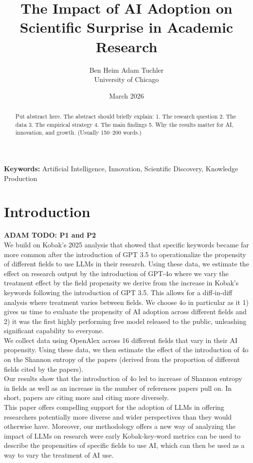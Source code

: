 \documentclass[11pt]{article}
\title{The Impact of AI Adoption on Scientific Surprise in Academic Research}
\author{
Ben Heim \hspace{1cm} Adam Tuchler \\
University of Chicago
}
\date{March 2026}
\begin{document}
\maketitle
\begin{abstract}
Put abstract here.
The abstract should briefly explain:
1. The research question
2. The data
3. The empirical strategy
4. The main findings
5. Why the results matter for AI, innovation, and growth.
(Usually 150–200 words.)
\end{abstract}
\noindent \textbf{Keywords:} Artificial Intelligence, Innovation, Scientific Discovery, Knowledge Production
\bigskip
\doublespacing
\section{Introduction}
\textbf{ADAM TODO: P1 and P2}\\
We build on Kobak's 2025 analysis that showed that specific keywords became far more common after the introduction of GPT 3.5 to operationalize the propensity of different fields to use LLMs in their research. Using these data, we estimate the effect on research output by the introduction of GPT-4o where we vary the treatment effect by the field propensity we derive from the increase in Kobak's keywords following the introduction of GPT 3.5. This allows for a diff-in-diff analysis where treatment varies between fields. We choose 4o in particular as it 1) gives us time to evaluate the propensity of AI adoption across different fields and 2) it was the first highly performing free model released to the public, unleashing significant capability to everyone.\\
We collect data using OpenAlex across 16 different fields that vary in their AI propensity. Using these data, we then estimate the effect of the introduction of 4o on the Shannon entropy of the papers (derived from the proportion of different fields cited by the papers).\\
Our results show that the introduction of 4o led to increase of Shannon entropy in fields as well as an increase in the number of references papers pull on. In short, papers are citing more and citing more diversely.\\
This paper offers compelling support for the adoption of LLMs in offering researchers potentially more diverse and wider perspectives than they would otherwise have. Moreover, our methodology offers a new way of analyzing the impact of LLMs on research were early Kobak-key-word metrics can be used to describe the propensities of specific fields to use AI, which can then be used as a way to vary the treatment of AI use.\\
\end{document}
